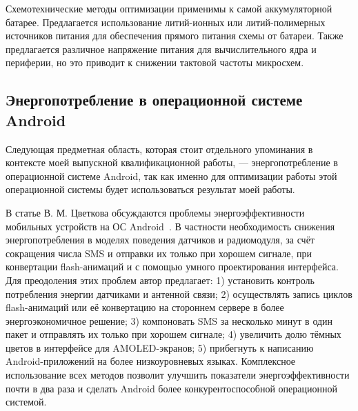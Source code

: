 \documentclass[a4paper,14pt]{extarticle} %
\begin{document}
	Схемотехнические методы оптимизации применимы к самой аккумуляторной батарее. Предлагается использование литий-ионных или литий-полимерных источников питания для обеспечения прямого питания схемы от батареи. Также предлагается различное напряжение питания для вычислительного ядра и периферии, но это приводит к снижении тактовой частоты микросхем.
	
	
	\subsection{Энергопотребление в операционной системе Android}

	Следующая предметная область, которая стоит отдельного упоминания в контексте моей выпускной квалификационной работы, --- энергопотребление в операционной системе Android, так как именно для оптимизации работы этой операционной системы будет использоваться результат моей работы.
	
	В статье В. М. Цветкова обсуждаются проблемы энергоэффективности мобильных устройств на ОС Android~\parencite{цветков2014энергоэффективность}. В частности необходимость снижения энергопотребления в моделях поведения датчиков и радиомодуля, за счёт сокращения числа SMS и отправки их только при хорошем сигнале, при конвертации flash-анимаций и с помощью умного проектирования интерфейса. Для преодоления этих проблем автор предлагает: 1) установить контроль потребления энергии датчиками и антенной связи; 2) осуществлять запись циклов flash-анимаций или её конвертацию на стороннем сервере в более энергоэкономичное решение; 3) компоновать SMS за несколько минут в один пакет и отправлять их только при хорошем сигнале; 4) увеличить долю тёмных цветов в интерфейсе для AMOLED-экранов; 5) прибегнуть к написанию Android-приложений на более низкоуровневых языках. Комплексное использование всех методов позволит улучшить показатели энергоэффективности почти в два раза и сделать Android более конкурентоспособной операционной системой.
	
\end{document}
